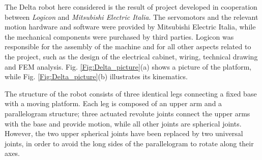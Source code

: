 \documentclass[]{interact}
\theoremstyle{plain}%
\theoremstyle{definition}
\theoremstyle{remark}
\begin{document}
The Delta robot here considered is the result of project developed in cooperation between \emph{Logicon} and \emph{Mitsubishi Electric Italia}. The servomotors and the relevant motion hardware and software were provided by Mitsubishi Electric Italia, while the mechanical components were purchased by third parties. Logicon was responsible for the assembly of the machine and for all other aspects related to the project, such as the design of the electrical cabinet, wiring, technical drawing and FEM analysis. Fig. \ref{Fig:Delta_picture}(a) shows a picture of the platform, while Fig. \ref{Fig:Delta_picture}(b) illustrates its kinematics.

The structure of the robot consists of three identical legs connecting a fixed base with a moving platform. Each leg is composed of an upper arm and a parallelogram structure; three actuated revolute joints connect the upper arms with the base and provide motion, while all other joints are spherical joints. However, the two upper spherical joints have been replaced by two universal joints, in order to avoid the long sides of the parallelogram to rotate along their axes.
\end{document}
